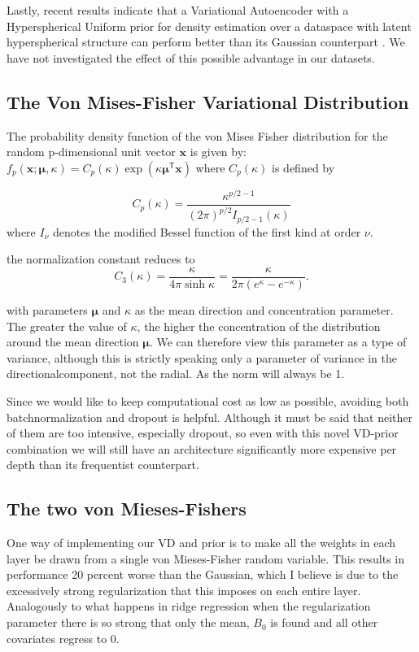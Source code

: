 \documentclass[nofootinbib,UKenglish,nobalancelastpage,12pt]{article}
\begin{document}
Lastly, recent results indicate that a Variational Autoencoder with a Hyperspherical Uniform prior for density estimation over a dataspace with latent hyperspherical structure can perform better than its Gaussian counterpart \cite{VAE_vmf_paper}. We have not investigated the effect of this possible advantage in our datasets.

\subsection{The Von Mises-Fisher Variational Distribution}
The probability density function of the von Mises Fisher distribution for the random p-dimensional unit vector ${\displaystyle \mathbf {x} }$  is given by:
$f_{p}(\mathbf{x}; \boldsymbol{\mu}, \kappa) = C_{p}(\kappa) \exp \left( {\kappa \boldsymbol{\mu}^\mathsf{T} \mathbf{x} } \right)$ where $C_p(\kappa)$ is defined by

$$
C_{p}(\kappa )={\frac {\kappa ^{p/2-1}}{(2\pi )^{p/2}I_{p/2-1}(\kappa )}}
$$
where ${I_{\nu}}$ denotes the modified Bessel function of the first kind at order ${\nu}$.

the normalization constant reduces to
$$
{\displaystyle C_{3}(\kappa )={\frac {\kappa }{4\pi \sinh \kappa }}={\frac {\kappa }{2\pi (e^{\kappa }-e^{-\kappa })}}.}
$$

with parameters $\boldsymbol{\mu}$ and $\kappa$ as the mean direction and concentration parameter. The greater the value of $\kappa$, the higher the concentration of the distribution around the mean direction $\boldsymbol{\mu}$. We can therefore view this parameter as a type of variance, although this is strictly speaking only a parameter of variance in the directionalcomponent, not the radial. As the norm will always be 1.

Since we would like to keep computational cost as low as possible, avoiding both batchnormalization and dropout is helpful. Although it must be said that neither of them are too intensive, especially dropout, so even with this novel VD-prior combination we will still have an architecture significantly more expensive per depth than its frequentist counterpart.

\subsection{The two von Mieses-Fishers}

One way of implementing our VD and prior is to make all the weights in each layer be drawn from a single von Mieses-Fisher random variable. This results in performance 20 percent worse than the Gaussian, which I believe is due to the excessively strong regularization that this imposes on each entire layer. Analogously to what happens in ridge regression when the regularization parameter there is so strong that only the mean, $B_{0}$ is found and all other covariates regress to 0. 
\end{document}
